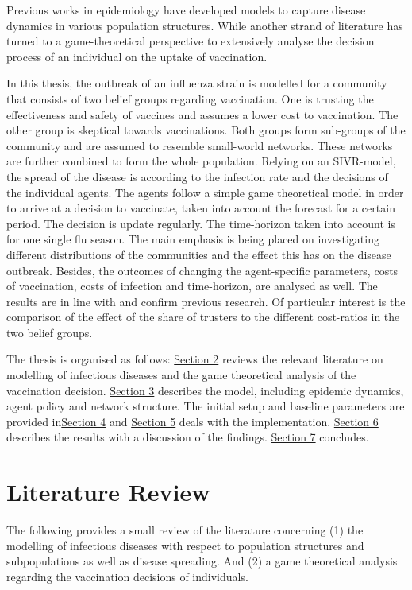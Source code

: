 \documentclass[11pt]{article}
\begin{document}
Previous works in epidemiology have developed models to capture disease dynamics in various population structures. While another strand of literature has turned to a game-theoretical perspective to extensively analyse the decision process of an individual on the uptake of vaccination. 

In this thesis, the outbreak of an influenza strain is modelled for a community that consists of two belief groups regarding vaccination. One is trusting the effectiveness and safety of vaccines and assumes a lower cost to vaccination. The other group is skeptical towards vaccinations. Both groups form sub-groups of the community and are assumed to resemble small-world networks. These networks are further combined to form the whole population.
Relying on an SIVR-model, the spread of the disease is according to the infection rate and the decisions of the individual agents. The agents follow a simple game theoretical model in order to arrive at a decision to vaccinate, taken into account the forecast for a certain period. The decision is update regularly. The time-horizon taken into account is for one single flu season.
The main emphasis is being placed on investigating different distributions of the communities and the effect this has on the disease outbreak. Besides, the outcomes of changing the agent-specific parameters, costs of vaccination, costs of infection and time-horizon, are analysed as well. The results are in line with and confirm previous research. Of particular interest is the comparison of the effect of  the share of trusters to the different cost-ratios in the two belief groups. 

The thesis is organised as follows: \hyperref[sec:LR]{Section 2} reviews the relevant literature on modelling of infectious diseases and the game theoretical analysis of the vaccination decision. \hyperref[sec:DM]{Section 3} describes the model, including epidemic dynamics, agent policy and network structure. The initial setup and baseline parameters are provided in\hyperref[sec:IS]{Section 4} and \hyperref[sec:Im]{Section 5} deals with the implementation. \hyperref[sec:SR]{Section 6} describes the results with a discussion of the findings. \hyperref[sec:SO]{Section 7} concludes. 

\section{Literature Review}
\label{sec:LR}
The following provides a small review of the literature concerning (1) the modelling of infectious diseases with respect to population structures and subpopulations as well as disease spreading. And (2) a game theoretical analysis regarding the vaccination decisions of individuals. 
\end{document}
